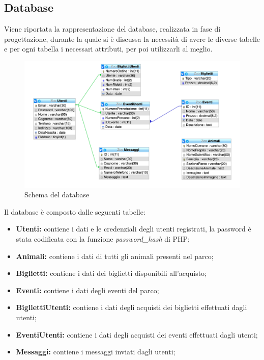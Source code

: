     \subsection{Database}
    Viene riportata la rappresentazione del database, realizzata in fase di progettazione, durante la quale si è discussa la necessità di avere le diverse tabelle e per ogni tabella i necessari attributi, per poi utilizzarli al meglio.
    \begin{figure}[H]
        \centering
        \includegraphics[width=15cm]{./img/database.png}
        \caption{Schema del database}  \label{fig:xray}
    \end{figure}
    Il database è composto dalle seguenti tabelle:
    \begin{itemize}
        \item \textbf{Utenti:} contiene i dati e le credenziali degli utenti registrati, la password è stata codificata con la funzione \textit{password\_hash} di PHP;
        \item \textbf{Animali:} contiene i dati di tutti gli animali presenti nel parco;
        \item \textbf{Biglietti:} contiene i dati dei biglietti disponibili all'acquisto;
        \item \textbf{Eventi:} contiene i dati degli eventi del parco;
        \item \textbf{BigliettiUtenti:} contiene i dati degli acquisti dei biglietti effettuati dagli utenti;
        \item \textbf{EventiUtenti:} contiene i dati degli acquisti dei eventi effettuati dagli utenti;
        \item \textbf{Messaggi:} contiene i messaggi inviati dagli utenti;
    \end{itemize}
